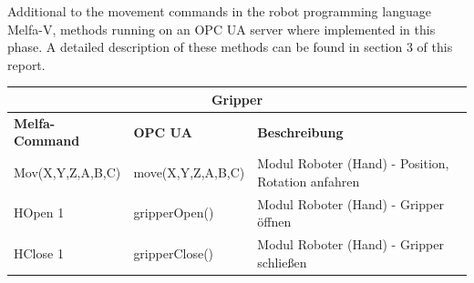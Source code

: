 \documentclass{article}
\begin{document}
\par Additional to the movement commands in the robot programming language Melfa-V, methods running on an OPC UA server where implemented in this phase. A detailed description of these methods can be found in section 3 of this report.
\begin{center}
	\setlength\extrarowheight{4pt}
	\small
		\begin{tabularx}{\textwidth}{|p{3cm}|p{4cm}|X|}
			\hline
			\multicolumn{3}{|c|}{\bf \color{white} \large Gripper}\\
			\hline\hline
			\bf Melfa-Command & \bf OPC UA & \bf Beschreibung\\
			\hline\hline
			Mov(X,Y,Z,A,B,C) & move(X,Y,Z,A,B,C) & Modul Roboter (Hand) - Position, Rotation anfahren\\
			\hline
			HOpen 1 & gripperOpen() & Modul Roboter (Hand) - Gripper öffnen\\
			\hline
			HClose 1 & gripperClose() & Modul Roboter (Hand) - Gripper schließen\\
			\hline
		\end{tabularx}
		\label{tab:robot_ctrl}
\end{center}
\end{document}
